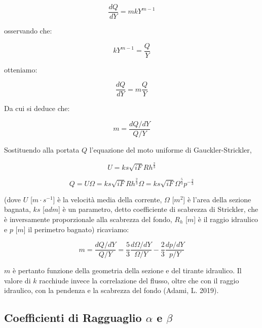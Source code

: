 \documentclass[12pt]{article} %
\begin{document}
\begin{equation}
    \frac{dQ}{dY}=mkY^{m-1}
    \label{eqn:m_1}
\end{equation}

\noindent osservando che:

\begin{equation}
   kY^{m-1}=\frac{Q}{Y}
   \label{eqn:m_2}
\end{equation}

\noindent otteniamo:

\begin{equation}
    \frac{dQ}{dY}=m\frac{Q}{Y}
    \label{eqn:m_3}
\end{equation}

\noindent Da cui si deduce che:

\begin{equation}
    m=\frac{dQ/dY}{Q/Y}
    \label{eqn:m_4}
\end{equation}

\noindent Sostituendo alla portata $Q$ l’equazione del moto uniforme di Gauckler-Strickler,
  
\begin{equation}
    U=ks\sqrt{iF}Rh^{\frac{2}{3}}
    \label{eqn:U_Gauckler-Strickler}
\end{equation}  
  
\begin{equation}
    Q=U\Omega=ks\sqrt{iF}Rh^{\frac{2}{3}}\Omega=ks\sqrt{iF}\Omega^{\frac{5}{3}}p^{-\frac{2}{3}}
    \label{eqn:Q_Gauckler-Strickler}
\end{equation}

\noindent (dove $U$ [$m\cdot s^{-1}$] è la velocità media della corrente, $\Omega$ [$m^2$] è l’area della sezione bagnata, $ks$ [$adm$] è un parametro, detto coefficiente di scabrezza di Strickler, che è inversamente proporzionale alla scabrezza del fondo, $R_h$ [$m$] è il raggio idraulico e $p$ [$m$] il perimetro bagnato) ricaviamo:

\begin{equation}
   m=\frac{dQ/dY}{Q/Y}=\frac{5}{3}\frac{d\Omega/dY}{\Omega/Y}-\frac{2}{3}\frac{dp/dY}{p/Y}
   \label{eqn:m_5}
\end{equation}

\noindent $m$ è pertanto funzione della geometria della sezione e del tirante idraulico. 
Il valore di $k$ racchiude invece la correlazione del flusso, oltre che con il raggio idraulico, con la pendenza e la scabrezza del fondo (Adami, L. 2019).

\subsection{\texorpdfstring{Coefficienti di Ragguaglio $\alpha$ e $\beta$}{} }
\end{document}
